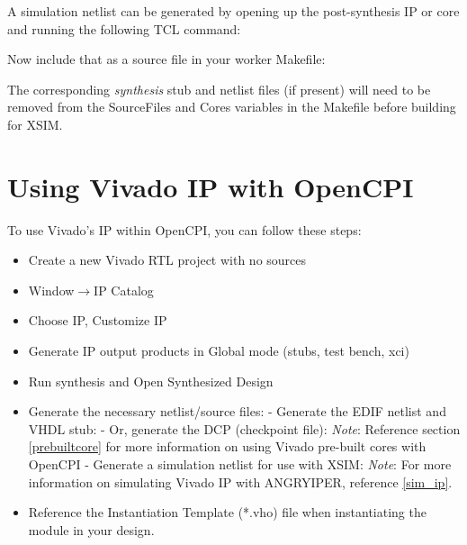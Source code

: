 \begin{flushleft}
A simulation netlist can be generated by opening up the post-synthesis IP or core and running the following TCL command:\newline
{}\newline

Now include that as a source file in your worker Makefile:\newline {}\newline

The corresponding \textit{synthesis} stub and netlist files (if present) will need to be removed from the SourceFiles and Cores variables in the Makefile before building for XSIM.

\section{Using Vivado IP with OpenCPI}
To use Vivado's IP within OpenCPI, you can follow these steps:
\begin{itemize}
\item Create a new Vivado RTL project with no sources
\item Window$\rightarrow$IP Catalog
\item Choose IP, Customize IP
\item Generate IP output products in Global mode (stubs, test bench, xci)
\item Run synthesis and Open Synthesized Design
\item Generate the necessary netlist/source files:
\subitem - Generate the EDIF netlist and VHDL stub:
\subsubitem {}
\subsubitem {}
\subitem - Or, generate the DCP (checkpoint file):
\subsubitem {}
\subitem  \textit{Note}: Reference section \ref{prebuiltcore} for more information on using Vivado pre-built cores with OpenCPI
\subitem - Generate a simulation netlist for use with XSIM:
\subsubitem {}
\subsubitem \textit{Note}: For more information on simulating Vivado IP with ANGRYIPER, reference \ref{sim_ip}.
\item Reference the Instantiation Template (*.vho) file when instantiating the module in your design.
\end{itemize}


\end{flushleft}

